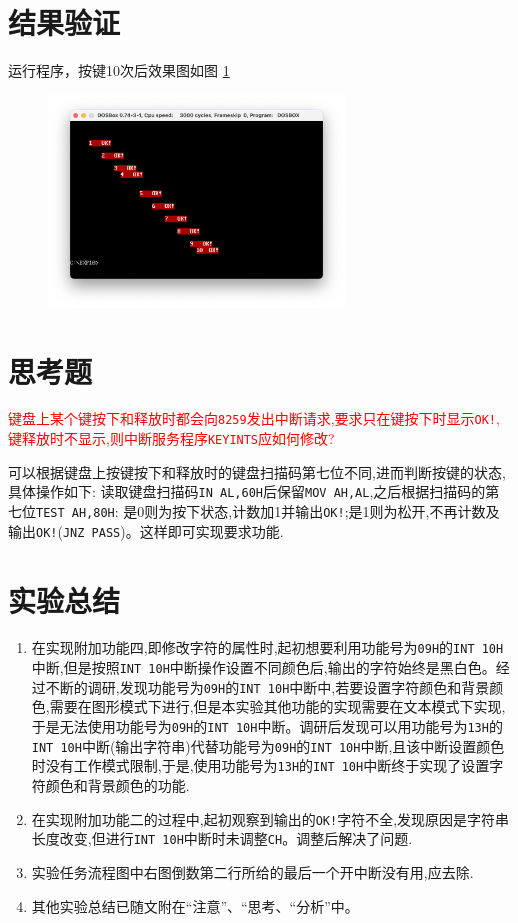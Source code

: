 \documentclass[11pt]{SEU-Digital-Report}
\begin{document}
\section{结果验证}
运行程序，按键10次后效果图如图 \ref{fig:rlt}
\begin{figure}[htbp]
    \centering
    \includegraphics[width=0.7\textwidth]{fig/rlt.png}
    \caption{}
    \label{fig:rlt}
\end{figure}

\section{思考题}
\textcolor{red}{键盘上某个键按下和释放时都会向\texttt{8259}发出中断请求,要求只在键按下时显示\texttt{OK!},键释放时不显示,则中断服务程序\texttt{KEYINTS}应如何修改?}

可以根据键盘上按键按下和释放时的键盘扫描码第七位不同,进而判断按键的状态,具体操作如下: 读取键盘扫描码\texttt{IN AL,60H}后保留\texttt{MOV AH,AL},之后根据扫描码的第七位\texttt{TEST AH,80H}: 是0则为按下状态,计数加1并输出\texttt{OK!};是1则为松开,不再计数及输出\texttt{OK!}(\texttt{JNZ PASS})。这样即可实现要求功能.

\section{实验总结}
\begin{enumerate}
    \item 在实现附加功能四,即修改字符的属性时,起初想要利用功能号为\texttt{09H}的\texttt{INT 10H}中断,但是按照\texttt{INT 10H}中断操作设置不同颜色后,输出的字符始终是黑白色。经过不断的调研,发现功能号为\texttt{09H}的\texttt{INT 10H}中断中,若要设置字符颜色和背景颜色,需要在图形模式下进行,但是本实验其他功能的实现需要在文本模式下实现,于是无法使用功能号为\texttt{09H}的\texttt{INT 10H}中断。调研后发现可以用功能号为\texttt{13H}的\texttt{INT 10H}中断(输出字符串)代替功能号为\texttt{09H}的\texttt{INT 10H}中断,且该中断设置颜色时没有工作模式限制,于是,使用功能号为\texttt{13H}的\texttt{INT 10H}中断终于实现了设置字符颜色和背景颜色的功能.
    \item 在实现附加功能二的过程中,起初观察到输出的\texttt{OK!}字符不全,发现原因是字符串长度改变,但进行\texttt{INT 10H}中断时未调整\texttt{CH}。调整后解决了问题.
    \item 实验任务流程图中右图倒数第二行所给的最后一个开中断没有用,应去除.
    \item 其他实验总结已随文附在“注意”、“思考、“分析”中。
\end{enumerate}



\printbibliography
\end{document}
